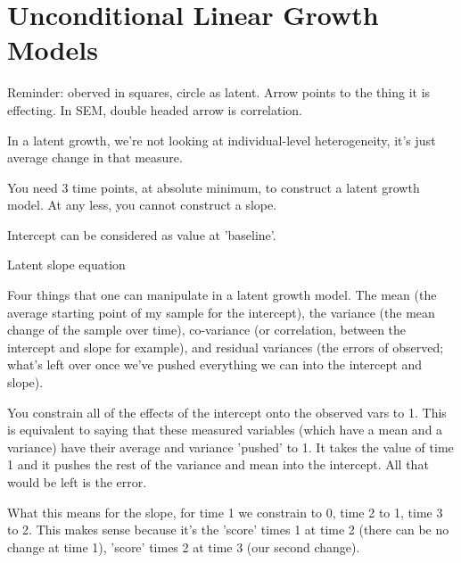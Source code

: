 \documentclass{article}
\begin{document}
\section{Unconditional Linear Growth Models}

Reminder: oberved in squares, circle as latent. Arrow points to the thing it is effecting.
In SEM, double headed arrow is correlation.

In a latent growth, we're not looking at individual-level heterogeneity,
it's just average change in that measure.

You need 3 time points, at absolute minimum, to construct a latent growth model.
At any less, you cannot construct a slope.

Intercept can be considered as value at 'baseline'.

Latent slope equation

Four things that one can manipulate in a latent growth model. 
The mean
(the average starting point of my sample for the intercept),
the variance
(the mean change of the sample over time),
co-variance 
(or correlation, between the intercept and slope for example),
and residual variances
(the errors of observed; what's left over once we've pushed everything we can into the
intercept and slope).

You constrain all of the effects of the intercept onto the observed vars to 1.
This is equivalent to saying that these measured variables (which have a mean and a variance)
have their average and variance 'pushed' to 1. It takes the value of time 1 and it pushes
the rest of the variance and mean into the intercept. All that would be left is the error.

What this means for the slope, for time 1 we constrain to 0, time 2 to 1, time 3 to 2.
This makes sense because it's the 'score' times 1 at time 2 (there can be no change at time 1),
'score' times 2 at time 3 (our second change).
\end{document}
